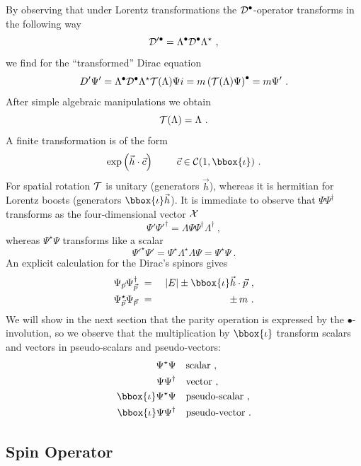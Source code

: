 By observing that under Lorentz transformations the 
${\cal D}^{\bullet}$-operator transforms in the following way
\[ {\cal D}'^{\bullet} = \Lambda^{\bullet} {\cal D}^{\bullet} 
\Lambda^{\star}~,\]
we find for the ``transformed'' Dirac equation
\[ D' \Psi' = 
   \Lambda^{\bullet} {\cal D}^{\bullet} \Lambda^{\star} 
   {\cal T}(\Lambda) \Psi i =
   m \left( {\cal T}(\Lambda) \Psi \right)^{\bullet} =
   m \Psi'~.
\]
After simple algebraic manipulations we obtain
\begin{equation}
{\cal T}(\Lambda) = \Lambda~. 
\end{equation}
A finite transformation is of the form
\[ \exp \left( \vec{h} \cdot \vec{c} \right)
   ~~~~~~~\vec{c} \in {\cal C}(1,\bbox{\iota})~. \]
For spatial rotation $\cal T$ is unitary (generators $\vec{h}$), 
whereas it is hermitian for Lorentz boosts 
(generators $\bbox{\iota} \vec{h}$). 
It is immediate to observe that $\Psi \Psi^{\dag}$ transforms
as the four-dimensional vector $\cal X$
\begin{equation}
\Psi' \Psi'^{\dag} = \Lambda \Psi \Psi^{\dag} \Lambda^{\dag}~,
\end{equation}
whereas $\Psi^{\star} \Psi$ transforms like a scalar
\begin{equation}
\Psi'^{\star} \Psi' = \Psi^{\star} \Lambda^{\star} \Lambda \Psi =
                      \Psi^{\star} \Psi~.
\end{equation}
An explicit calculation for the Dirac's spinors gives
\begin{eqnarray*} 
\Psi_{\vec{p}} \Psi_{\vec{p}}^{\dag} & ~=~ & 
|E| \pm \bbox{\iota} \vec{h} \cdot \vec{p}~,\\
\Psi_{\vec{p}}^{\star} \Psi_{\vec{p}} & ~=~ & 
\pm \, m~.
\end{eqnarray*}
We will show in the next section that the parity operation is expressed 
by the $\bullet$-involution, so we observe that the multiplication
by $\bbox{\iota}$ transform scalars and vectors in pseudo-scalars and
pseudo-vectors:
\begin{eqnarray*}
\Psi^{\star} \Psi & ~~~\mbox{scalar}~,\\ 
\Psi \Psi^{\dag}  & ~~~\mbox{vector}~,\\
\bbox{\iota} \Psi^{\star} \Psi & ~~~\mbox{pseudo-scalar}~,\\ 
\bbox{\iota} \Psi \Psi^{\dag}  & ~~~\mbox{pseudo-vector}~.
\end{eqnarray*}


\subsection{Spin Operator}
\label{s43}

